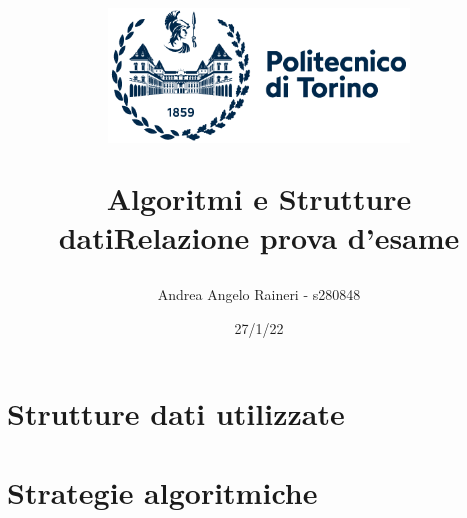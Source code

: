 \documentclass[11pt, a4paper, titlepage]{article}
\begin{document}
    \title{
        \begin{figure}[t]
            \includegraphics[width=8cm]{logo.png}
            \centering
        \end{figure}
            \textbf{Algoritmi e Strutture dati\break Relazione prova d'esame}
        }
    \author{Andrea Angelo Raineri - s280848}
    \date{27/1/22}
    \maketitle

    \section{Strutture dati utilizzate}


    \section{Strategie algoritmiche}
\end{document}
